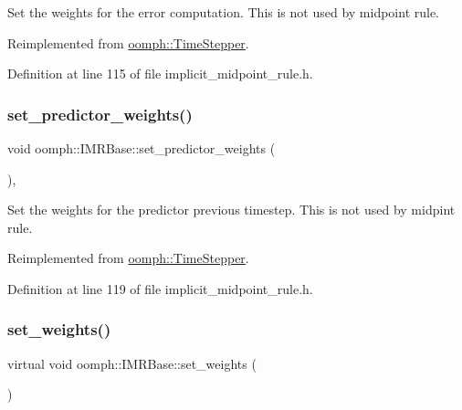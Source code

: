 Set the weights for the error computation. This is not used by midpoint rule. 



Reimplemented from \hyperlink{classoomph_1_1TimeStepper_aee0c1da870a603e64efebb51dfc96a3d}{oomph\+::\+Time\+Stepper}.



Definition at line 115 of file implicit\+\_\+midpoint\+\_\+rule.\+h.

\mbox{\label{classoomph_1_1IMRBase_a68771c915a13f5a3e3655fff12cb73a3}} 
\subsubsection{\texorpdfstring{set\+\_\+predictor\+\_\+weights()}{set\_predictor\_weights()}}
{\footnotesize\ttfamily void oomph\+::\+I\+M\+R\+Base\+::set\+\_\+predictor\+\_\+weights (\begin{DoxyParamCaption}{ }\end{DoxyParamCaption})\hspace{0.3cm}{\ttfamily [inline]}, {\ttfamily [virtual]}}



Set the weights for the predictor previous timestep. This is not used by midpint rule. 



Reimplemented from \hyperlink{classoomph_1_1TimeStepper_a2dfb949155ba433066fd69dc427ba1ce}{oomph\+::\+Time\+Stepper}.



Definition at line 119 of file implicit\+\_\+midpoint\+\_\+rule.\+h.

\mbox{\label{classoomph_1_1IMRBase_a36b8a37b4c0bb9e8cca821bfb74fd373}} 
\subsubsection{\texorpdfstring{set\+\_\+weights()}{set\_weights()}}
{\footnotesize\ttfamily virtual void oomph\+::\+I\+M\+R\+Base\+::set\+\_\+weights (\begin{DoxyParamCaption}{ }\end{DoxyParamCaption})\hspace{0.3cm}{\ttfamily [pure virtual]}}



